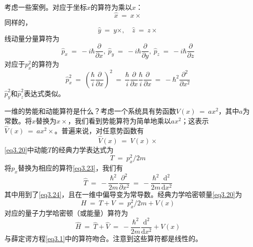 \documentclass[12pt,a4paper,openany]{ctexbook}
\begin{document}
\begin{flushleft}
考虑一些案例。对应于坐标$x$的算符为乘以$x$：
\begin{equation}
    \boxed{\hat{x}\ =\ x\times}
    \label{eq3.21}
\end{equation}
同样的，
\begin{equation}
    \boxed{\hat{y}\ =\ y\times,\quad\hat{z}\ =\ z\times}
    \label{eq3.22}
\end{equation}
线动量分量算符为
\begin{equation}
    \boxed{\hat{p}_x\ =\ -i\hbar\frac{\partial}{\partial x},\ \hat{p}_y\ =\ -i\hbar\frac{\partial}{\partial y},\ \hat{p}_z\ =\ -i\hbar\frac{\partial}{\partial z}}
    \label{eq3.23}
\end{equation}
对应于$p_x^2$的算符为
\begin{equation}
    \hat{p}_x^2\ =\ (\frac{\hbar}{i}\frac{\partial}{\partial x})^2\ =\ \frac{\hbar}{i}\frac{\partial}{\partial x}\frac{\hbar}{i}\frac{\partial}{\partial x}\ =\ -\hbar^2\frac{\partial^2}{\partial x^2}
    \label{eq3.24}
\end{equation}
$\hat{p}_y^2$和$\hat{p}_z^2$表达式类似。

一维的势能和动能算符是什么？考虑一个系统具有势函数$V(x)\ =\ ax^2$，其中$a$为常数。将$x$替换为$x\times$，我们看到势能算符为简单地乘以$ax^2$；这表示$\hat{V}(x)\ =\ ax^2\times$。普遍来说，对任意势函数有
\begin{equation}
    \boxed{\hat{V}(x)\ =\ V(x)\times}
\end{equation}
\eqref{eq3.20}中动能$T$的经典力学表达式为
\begin{equation}
    \boxed{T\ =\ p_x^2/2m}
\end{equation}
将$p_x$替换为相应的算符\eqref{eq3.23}，我们有
\begin{equation}
    \hat{T}\ =\ -\frac{\hbar^2}{2m}\frac{\partial^2}{\partial x^2}\ =\ -\frac{\hbar^2}{2m}\frac{\mathrm{d}^2}{\mathrm{d} x^2} \label{eq3.27}
\end{equation}
其中用到了\eqref{eq3.24}，且在一维中偏导变为常导数。经典力学哈密顿量\eqref{eq3.20}为
\begin{equation}
    H\ =\ T+V\ =\ p_x^2/2m+V(x)
\end{equation}
对应的量子力学哈密顿（或能量）算符为
\begin{equation}
    \boxed{\hat{H}\ =\ \hat{T}+\hat{V}\ =\ -\frac{\hbar^2}{2m}\frac{\mathrm{d}^2}{\mathrm{d}x^2}+V(x)}
    \label{eq3.29}
\end{equation}
与薛定谔方程\eqref{eq3.1}中的算符吻合。注意到这些算符都是线性的。


\end{flushleft}
\end{document}
